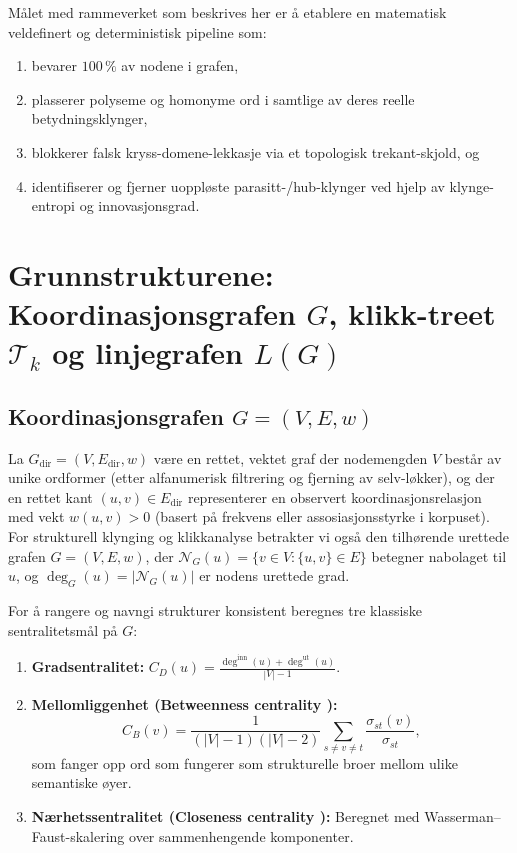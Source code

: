 \documentclass[11pt,a4paper]{article}
\begin{document}
Målet med rammeverket som beskrives her er å etablere en matematisk veldefinert og deterministisk pipeline som:
\begin{enumerate}[label=(\roman*)]
  \item bevarer $100\,\%$ av nodene i grafen,
  \item plasserer polyseme og homonyme ord i samtlige av deres reelle betydningsklynger,
  \item blokkerer falsk kryss-domene-lekkasje via et topologisk trekant-skjold, og
  \item identifiserer og fjerner uoppløste parasitt-/hub-klynger ved hjelp av klynge-entropi og innovasjonsgrad.
\end{enumerate}

\section{Grunnstrukturene: Koordinasjonsgrafen $G$, klikk-treet $\mathcal{T}_k$ og linjegrafen $L(G)$}

\subsection{Koordinasjonsgrafen $G = (V, E, w)$}
La $G_{\text{dir}} = (V, E_{\text{dir}}, w)$ være en rettet, vektet graf der nodemengden $V$ består av unike ordformer (etter alfanumerisk filtrering og fjerning av selv-løkker), og der en rettet kant $(u, v) \in E_{\text{dir}}$ representerer en observert koordinasjonsrelasjon med vekt $w(u, v) > 0$ (basert på frekvens eller assosiasjonsstyrke i korpuset). For strukturell klynging og klikkanalyse betrakter vi også den tilhørende urettede grafen $G = (V, E, w)$, der $\mathcal{N}_G(u) = \{v \in V : \{u, v\} \in E\}$ betegner nabolaget til $u$, og $\deg_G(u) = |\mathcal{N}_G(u)|$ er nodens urettede grad.

For å rangere og navngi strukturer konsistent beregnes tre klassiske sentralitetsmål på $G$:
\begin{enumerate}[label=\arabic*.]
  \item \textbf{Gradsentralitet:} $C_D(u) = \frac{\deg^{\text{inn}}(u) + \deg^{\text{ut}}(u)}{|V| - 1}$.
  \item \textbf{Mellomliggenhet (Betweenness centrality \cite{brandes2001faster}):}
    \[
      C_B(v) = \frac{1}{(|V|-1)(|V|-2)} \sum_{s \ne v \ne t} \frac{\sigma_{st}(v)}{\sigma_{st}},
    \]
    som fanger opp ord som fungerer som strukturelle broer mellom ulike semantiske øyer.
  \item \textbf{Nærhetssentralitet (Closeness centrality \cite{wasserman1994social}):} Beregnet med Wasserman--Faust-skalering over sammenhengende komponenter.
\end{enumerate}
\end{document}
